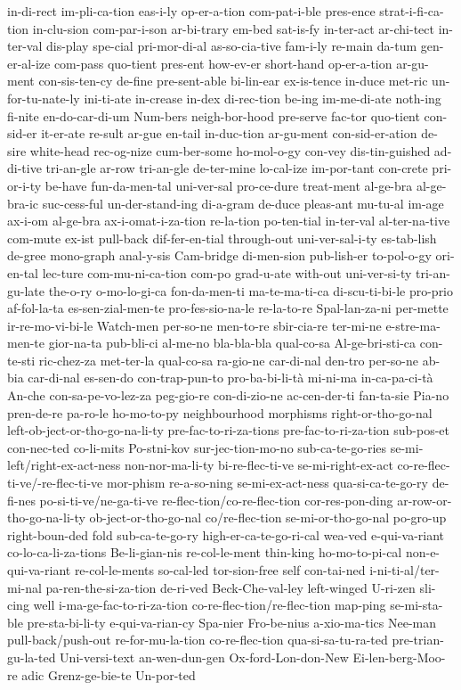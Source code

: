 {in-di-rect
im-pli-ca-tion
eas-i-ly
op-er-a-tion
com-pat-i-ble
pres-ence
strat-i-fi-ca-tion
in-clu-sion
com-par-i-son
ar-bi-trary
em-bed
sat-is-fy
in-ter-act
ar-chi-tect
in-ter-val
dis-play
spe-cial
pri-mor-di-al
as-so-cia-tive
fam-i-ly
re-main
da-tum
gen-er-al-ize
com-pass
quo-tient
pres-ent
how-ev-er
short-hand
op-er-a-tion
ar-gu-ment
con-sis-ten-cy
de-fine
pre-sent-able
bi-lin-ear
ex-is-tence
in-duce
met-ric
un-for-tu-nate-ly
ini-ti-ate
in-crease
in-dex
di-rec-tion
be-ing
im-me-di-ate
noth-ing
fi-nite
en-do-car-di-um
Num-bers
neigh-bor-hood
pre-serve
fac-tor
quo-tient
con-sid-er
it-er-ate
re-sult
ar-gue
en-tail
in-duc-tion
ar-gu-ment
con-sid-er-ation
de-sire
white-head
rec-og-nize
cum-ber-some
ho-mol-o-gy
con-vey
dis-tin-guished
ad-di-tive
tri-an-gle
ar-row
tri-an-gle
de-ter-mine
lo-cal-ize
im-por-tant
con-crete
pri-or-i-ty
be-have
fun-da-men-tal
uni-ver-sal
pro-ce-dure
treat-ment
al-ge-bra
al-ge-bra-ic
suc-cess-ful
un-der-stand-ing
di-a-gram
de-duce
pleas-ant
mu-tu-al
im-age
ax-i-om
al-ge-bra
ax-i-omat-i-za-tion
re-la-tion
po-ten-tial
in-ter-val
al-ter-na-tive
com-mute
ex-ist
pull-back
dif-fer-en-tial
through-out
uni-ver-sal-i-ty
es-tab-lish
de-gree
mono-graph
anal-y-sis
Cam-bridge
di-men-sion
pub-lish-er
to-pol-o-gy
ori-en-tal
lec-ture
com-mu-ni-ca-tion
com-po
grad-u-ate
with-out
uni-ver-si-ty
tri-an-gu-late
the-o-ry
%
%
o-mo-lo-gi-ca
fon-da-men-ti
ma-te-ma-ti-ca
di-scu-ti-bi-le
pro-prio
af-fol-la-ta
es-sen-zial-men-te
pro-fes-sio-na-le
re-la-to-re
Spal-lan-za-ni
per-mette
ir-re-mo-vi-bi-le
Watch-men
per-so-ne
men-to-re
sbir-cia-re
ter-mi-ne
e-stre-ma-men-te
gior-na-ta
pub-bli-ci
al-me-no
bla-bla-bla
qual-co-sa
Al-ge-bri-sti-ca
con-te-sti
ric-chez-za
met-ter-la
qual-co-sa
ra-gio-ne
car-di-nal
den-tro
per-so-ne
ab-bia
car-di-nal
es-sen-do
con-trap-pun-to
pro-ba-bi-li-tà
mi-ni-ma
in-ca-pa-ci-tà
An-che
con-sa-pe-vo-lez-za
peg-gio-re
con-di-zio-ne
ac-cen-der-ti
fan-ta-sie
Pia-no
pren-de-re
pa-ro-le
%
%
ho-mo-to-py
neighbourhood
morphisms
right-or-tho-go-nal
left-ob-ject-or-tho-go-na-li-ty
pre-fac-to-ri-za-tions
pre-fac-to-ri-za-tion
sub-pos-et
con-nec-ted
co-li-mits
Po-stni-kov
sur-jec-tion-mo-no
sub-ca-te-go-ries
se-mi-left/right-ex-act-ness
non-nor-ma-li-ty
bi-re-flec-ti-ve
se-mi-right-ex-act
co-re-flec-ti-ve/-re-flec-ti-ve
mor-phism
re-a-so-ning
se-mi-ex-act-ness
qua-si-ca-te-go-ry
de-fi-nes
po-si-ti-ve/ne-ga-ti-ve
re-flec-tion/co-re-flec-tion
cor-res-pon-ding
ar-row-or-tho-go-na-li-ty
ob-ject-or-tho-go-nal
co/re-flec-tion
se-mi-or-tho-go-nal
po-gro-up
right-boun-ded
fold
sub-ca-te-go-ry
high-er-ca-te-go-ri-cal
wea-ved
e-qui-va-riant
co-lo-ca-li-za-tions
Be-li-gian-nis
re-col-le-ment
thin-king
ho-mo-to-pi-cal
non-e-qui-va-riant
re-col-le-ments
so-cal-led
tor-sion-free
self
con-tai-ned
i-ni-ti-al/ter-mi-nal
pa-ren-the-si-za-tion
de-ri-ved
Beck-Che-val-ley
left-winged
U-ri-zen
sli-cing
well
i-ma-ge-fac-to-ri-za-tion
co-re-flec-tion/re-flec-tion
map-ping
se-mi-sta-ble
pre-sta-bi-li-ty
e-qui-va-rian-cy
Spa-nier
Fro-be-nius
a-xio-ma-tics
Nee-man
pull-back/push-out
re-for-mu-la-tion
co-re-flec-tion
qua-si-sa-tu-ra-ted
pre-trian-gu-la-ted
Uni-versi-text
an-wen-dun-gen
Ox-ford-Lon-don-New
Ei-len-berg-Moo-re
adic
Grenz-ge-bie-te
Un-por-ted
}
